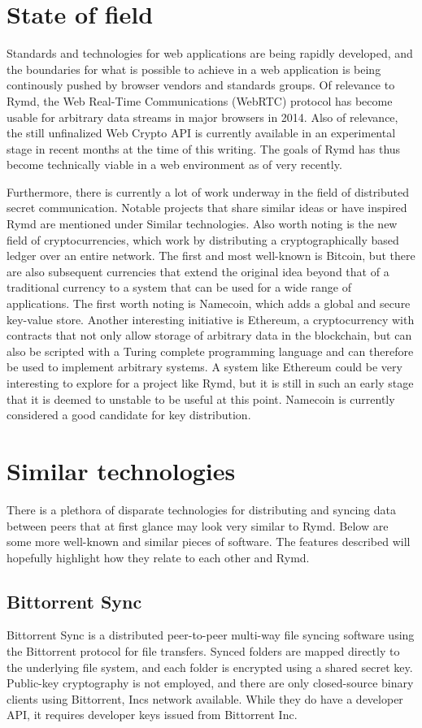 \section{State of field}
Standards and technologies for web applications are being rapidly developed, and the boundaries for what is possible to achieve in a web application is being continously pushed by browser vendors and standards groups. Of relevance to Rymd, the Web Real-Time Communications (WebRTC) protocol has become usable for arbitrary data streams in major browsers in 2014. Also of relevance, the still unfinalized Web Crypto API is currently available in an experimental stage in recent months at the time of this writing. The goals of Rymd has thus become technically viable in a web environment as of very recently.

Furthermore, there is currently a lot of work underway in the field of distributed secret communication. Notable projects that share similar ideas or have inspired Rymd are mentioned under Similar technologies. Also worth noting is the new field of cryptocurrencies, which work by distributing a cryptographically based ledger over an entire network. The first and most well-known is Bitcoin, but there are also subsequent currencies that extend the original idea beyond that of a traditional currency to a system that can be used for a wide range of applications. The first worth noting is Namecoin, which adds a global and secure key-value store. Another interesting initiative is Ethereum, a cryptocurrency with contracts that not only allow storage of arbitrary data in the blockchain, but can also be scripted with a Turing complete programming language and can therefore be used to implement arbitrary systems. A system like Ethereum could be very interesting to explore for a project like Rymd, but it is still in such an early stage that it is deemed to unstable to be useful at this point. Namecoin is currently considered a good candidate for key distribution.

\section{Similar technologies}
There is a plethora of disparate technologies for distributing and syncing data between peers that at first glance may look very similar to Rymd. Below are some more well-known and similar pieces of software. The features described will hopefully highlight how they relate to each other and Rymd.
\subsection{Bittorrent Sync}
Bittorrent Sync\cite{BitTorent:2014:Online} is a distributed peer-to-peer multi-way file syncing software using the Bittorrent protocol for file transfers. Synced folders are mapped directly to the underlying file system, and each folder is encrypted using a shared secret key. Public-key cryptography is not employed, and there are only closed-source binary clients using Bittorrent, Incs network available. While they do have a developer API, it requires developer keys issued from Bittorrent Inc.

